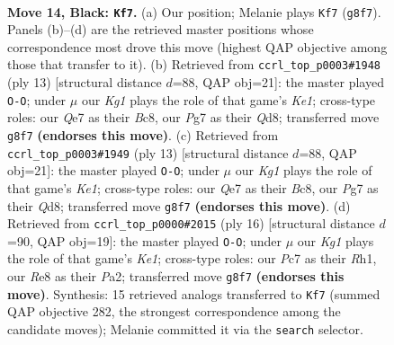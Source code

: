 \documentclass[11pt]{article}
\begin{document}
\clearpage

\begin{figure}[p]\centering
\begin{subfigure}{0.46\textwidth}\centering
\resizebox{\linewidth}{!}{%
\newchessgame
\chessboard[
  setfen={rnb1r1k1/2pnq1pp/pp2p3/3pPp2/3P1P1P/8/PPPKN1P1/1R2QBNR b - - 3 14},
  showmover=false,
  pgfstyle=straightmove, color=movearrow, markmove={g8-f7}
]}
\caption{}
\end{subfigure}\hfill
\begin{subfigure}{0.46\textwidth}\centering
\resizebox{\linewidth}{!}{%
\newchessgame
\chessboard[
  setfen={rnbqk2r/ppp2pbp/3p1np1/8/3Pp3/1P2P3/PBPNBPPP/RN1QK2R b KQkq - 3 7},
  showmover=false,
  pgfstyle=straightmove, color=movearrow, markmove={e8-g8}
]}
\caption{}
\end{subfigure}
\\[4pt]
\begin{subfigure}{0.46\textwidth}\centering
\resizebox{\linewidth}{!}{%
\newchessgame
\chessboard[
  setfen={rnbqk2r/ppp2pbp/3p1np1/8/3Pp3/1P2P3/PBPNBPPP/RN1QK2R b KQkq - 3 7},
  showmover=false,
  pgfstyle=straightmove, color=movearrow, markmove={e8-g8}
]}
\caption{}
\end{subfigure}\hfill
\begin{subfigure}{0.46\textwidth}\centering
\resizebox{\linewidth}{!}{%
\newchessgame
\chessboard[
  setfen={rn1qk2r/pb1p1ppp/1p2pn2/2p5/2PP4/5NP1/PPQ1PPBP/RN2K2R w KQkq - 2 9},
  showmover=false,
  pgfstyle=straightmove, color=movearrow, markmove={e1-g1}
]}
\caption{}
\end{subfigure}
\caption{\textbf{Move 14, Black: \texttt{Kf7}.} (a) Our position; Melanie plays \texttt{Kf7} (\texttt{g8f7}). Panels (b)--(d) are the retrieved master positions whose correspondence most drove this move (highest QAP objective among those that transfer to it). (b) Retrieved from \texttt{ccrl\_top\_p0003\#1948} (ply 13) [structural distance $d$=88, QAP obj=21]: the master played \texttt{O-O}; under $\mu$ our \emph{Kg1} plays the role of that game's \emph{Ke1}; cross-type roles: our \emph{Q}e7 as their \emph{B}c8, our \emph{P}g7 as their \emph{Q}d8; transferred move \texttt{g8f7} \textbf{(endorses this move)}. (c) Retrieved from \texttt{ccrl\_top\_p0003\#1949} (ply 13) [structural distance $d$=88, QAP obj=21]: the master played \texttt{O-O}; under $\mu$ our \emph{Kg1} plays the role of that game's \emph{Ke1}; cross-type roles: our \emph{Q}e7 as their \emph{B}c8, our \emph{P}g7 as their \emph{Q}d8; transferred move \texttt{g8f7} \textbf{(endorses this move)}. (d) Retrieved from \texttt{ccrl\_top\_p0000\#2015} (ply 16) [structural distance $d$=90, QAP obj=19]: the master played \texttt{O-O}; under $\mu$ our \emph{Kg1} plays the role of that game's \emph{Ke1}; cross-type roles: our \emph{P}c7 as their \emph{R}h1, our \emph{R}e8 as their \emph{P}a2; transferred move \texttt{g8f7} \textbf{(endorses this move)}. Synthesis: 15 retrieved analogs transferred to \texttt{Kf7} (summed QAP objective 282, the strongest correspondence among the candidate moves); Melanie committed it via the \texttt{search} selector.}
\label{fig:thought-m27}
\end{figure}
\end{document}

